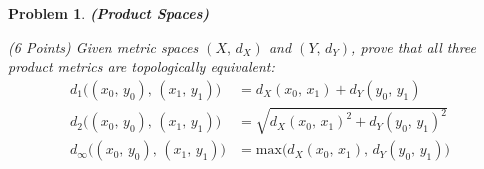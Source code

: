 \documentclass{article}
\theoremstyle{normal}
\newtheorem{problem}{Problem}
\begin{document}
    \begin{problem}
        \textbf{(Product Spaces)}
        \par\hfill\par
        (6 Points) Given metric spaces $(X,\,d_{X})$
        and $(Y,\,d_{Y})$, prove that all three product metrics are
        topologically equivalent:
        \begin{align}
            d_{1}\big((x_{0},\,y_{0}),\,(x_{1},\,y_{1})\big)
                &=d_{X}(x_{0},\,x_{1})+d_{Y}(y_{0},\,y_{1})\\
            d_{2}\big((x_{0},\,y_{0}),\,(x_{1},\,y_{1})\big)
                &=\sqrt{d_{X}(x_{0},\,x_{1})^{2}+d_{Y}(y_{0},\,y_{1})^{2}}\\
            d_{\infty}\big((x_{0},\,y_{0}),\,(x_{1},\,y_{1})\big)
                &=\textrm{max}\big(%
                    d_{X}(x_{0},\,x_{1}),\,d_{Y}(y_{0},\,y_{1})
                \big)
        \end{align}
    \end{problem}
\end{document}
